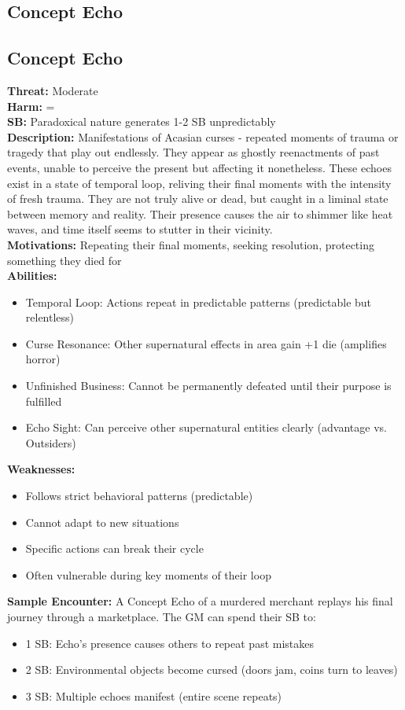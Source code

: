 \documentclass[11pt]{article}
\newenvironment{monsterentry}[1]{%
  \begin{mdframed}[backgroundcolor=shadecolor, linewidth=0pt, leftmargin=0pt, rightmargin=0pt]%
  \subsection*{#1}%
}{%
  \end{mdframed}%
}
\begin{document}
\subsection{Concept Echo}

\begin{monsterentry}{Concept Echo}
\textbf{Threat:} Moderate \\
\textbf{Harm:} = \\
\textbf{SB:} Paradoxical nature generates 1-2 SB unpredictably \\
\textbf{Description:} Manifestations of Acasian curses - repeated moments of trauma or tragedy that play out endlessly. They appear as ghostly reenactments of past events, unable to perceive the present but affecting it nonetheless. These echoes exist in a state of temporal loop, reliving their final moments with the intensity of fresh trauma. They are not truly alive or dead, but caught in a liminal state between memory and reality. Their presence causes the air to shimmer like heat waves, and time itself seems to stutter in their vicinity. \\
\textbf{Motivations:} Repeating their final moments, seeking resolution, protecting something they died for \\
\textbf{Abilities:}
\begin{itemize}
    \item Temporal Loop: Actions repeat in predictable patterns (predictable but relentless)
    \item Curse Resonance: Other supernatural effects in area gain +1 die (amplifies horror)
    \item Unfinished Business: Cannot be permanently defeated until their purpose is fulfilled
    \item Echo Sight: Can perceive other supernatural entities clearly (advantage vs. Outsiders)
\end{itemize}
\textbf{Weaknesses:}
\begin{itemize}
    \item Follows strict behavioral patterns (predictable)
    \item Cannot adapt to new situations
    \item Specific actions can break their cycle
    \item Often vulnerable during key moments of their loop
\end{itemize}
\textbf{Sample Encounter:} A Concept Echo of a murdered merchant replays his final journey through a marketplace. The GM can spend their SB to:
\begin{itemize}
    \item 1 SB: Echo's presence causes others to repeat past mistakes
    \item 2 SB: Environmental objects become cursed (doors jam, coins turn to leaves)
    \item 3 SB: Multiple echoes manifest (entire scene repeats)
\end{itemize}
\end{monsterentry}
\end{document}
